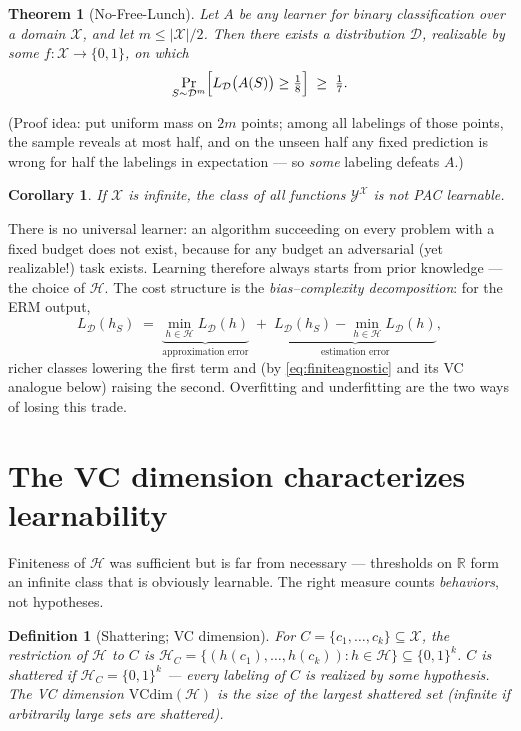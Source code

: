 \documentclass[11pt]{article}
\newtheorem{theorem}{Theorem}
\newtheorem{corollary}{Corollary}
\newtheorem{definition}{Definition}
\newcommand{\X}{\mathcal{X}}
\newcommand{\Y}{\mathcal{Y}}
\newcommand{\D}{\mathcal{D}}
\newcommand{\Hyp}{\mathcal{H}}
\newcommand{\err}{L_{\D}}
\newcommand{\VC}{\mathrm{VCdim}}
\begin{document}
\begin{theorem}[No-Free-Lunch]
\label{thm:nfl}
Let $A$ be any learner for binary classification over a domain $\X$, and
let $m \le |\X|/2$. Then there exists a distribution $\D$, realizable by
some $f:\X\to\{0,1\}$, on which
\begin{equation}
  \Pr_{S\sim\D^m}\Bigl[\err\bigl(A(S)\bigr) \ge \tfrac18\Bigr]
  \;\ge\; \tfrac17 .
  \label{eq:nfl}
\end{equation}
\end{theorem}

(Proof idea: put uniform mass on $2m$ points; among all labelings of
those points, the sample reveals at most half, and on the unseen half any
fixed prediction is wrong for half the labelings in expectation ---
so \emph{some} labeling defeats $A$.)

\begin{corollary}
If $\X$ is infinite, the class of \emph{all} functions $\Y^{\X}$ is not
PAC learnable.
\end{corollary}

There is no universal learner: an algorithm succeeding on every problem
with a fixed budget does not exist, because for any budget an adversarial
(yet realizable!) task exists. Learning therefore always starts from
prior knowledge --- the choice of $\Hyp$. The cost structure is the
\emph{bias--complexity decomposition}: for the ERM output,
\begin{equation}
  \err(h_S)
  \;=\;
  \underbrace{\min_{h\in\Hyp}\err(h)}_{\text{approximation error}}
  \;+\;
  \underbrace{\err(h_S) - \min_{h\in\Hyp}\err(h)}_{\text{estimation error}} ,
  \label{eq:biascomplexity}
\end{equation}
richer classes lowering the first term and (by
\eqref{eq:finiteagnostic} and its VC analogue below) raising the second.
Overfitting and underfitting are the two ways of losing this trade.

\section{The VC dimension characterizes learnability}

Finiteness of $\Hyp$ was sufficient but is far from necessary ---
thresholds on $\mathbb{R}$ form an infinite class that is obviously
learnable. The right measure counts \emph{behaviors}, not hypotheses.

\begin{definition}[Shattering; VC dimension]
For $C = \{c_1,\dots,c_k\} \subseteq \X$, the \emph{restriction} of
$\Hyp$ to $C$ is
$\Hyp_C = \{(h(c_1),\dots,h(c_k)) : h\in\Hyp\} \subseteq \{0,1\}^k$.
$C$ is \emph{shattered} if $\Hyp_C = \{0,1\}^{k}$ --- every labeling of
$C$ is realized by some hypothesis. The \emph{VC dimension} $\VC(\Hyp)$
is the size of the largest shattered set (infinite if arbitrarily large
sets are shattered).
\end{definition}
\end{document}
